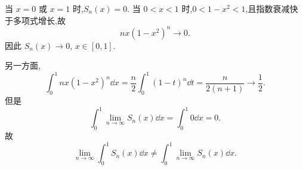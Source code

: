 \begin{solution}
	当 $x=0$ 或 $x=1$ 时,$S_n(x)=0$. 当 $0<x<1$ 时,$0<1-x^2<1$,且指数衰减快于多项式增长,故
	\[
	nx(1-x^2)^n\to0.
	\]
	因此 $S_n(x)\to0$, $x\in[0,1]$.
	
	另一方面,
	\[
	\int_0^1 nx(1-x^2)^n\dd x
	=\frac n2\int_0^1(1-t)^n\dd t
	=\frac n{2(n+1)}\to\frac12.
	\]
	但是
	\[
	\int_0^1\lim_{n\to\infty}S_n(x)\dd x=\int_0^1 0\dd x=0.
	\]
	故
	\[
	\lim_{n\to\infty}\int_0^1S_n(x)\dd x
	\neq
	\int_0^1\lim_{n\to\infty}S_n(x)\dd x.
	\]
	
\end{solution}
